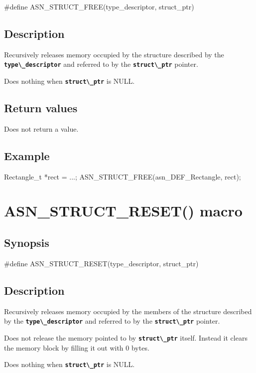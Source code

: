 \documentclass[english,oneside,12pt]{book}
\newcommand{\apisection}[2]{\clearpage\section{\label{#1}#2}}
\newcommand{\code}[1]{\texttt{\textbf{\lstinline{#1}}}}
\begin{document}
\begin{signature}
#define ASN_STRUCT_FREE(type_descriptor, struct_ptr)
\end{signature}

\subsection*{Description}

Recursively releases memory occupied by the structure
described by the \code{type\_descriptor} and referred to
by the \code{struct\_ptr} pointer.

Does nothing when \code{struct\_ptr} is NULL.

\subsection*{Return values}
Does not return a value.

\subsection*{Example}

\begin{example}
Rectangle_t *rect = ...;
ASN_STRUCT_FREE(asn_DEF_Rectangle, rect);
\end{example}

\apisection{sec:ASN_STRUCT_RESET}{ASN\_STRUCT\_RESET() macro}

\subsection*{Synopsis}

\begin{signature}
#define ASN_STRUCT_RESET(type_descriptor, struct_ptr)
\end{signature}

\subsection*{Description}

Recursively releases memory occupied by the members of the structure
described by the \code{type\_descriptor} and referred to
by the \code{struct\_ptr} pointer.

Does not release the memory pointed to by \code{struct\_ptr} itself.
Instead it clears the memory block by filling it out with 0 bytes.

Does nothing when \code{struct\_ptr} is NULL.
\end{document}
